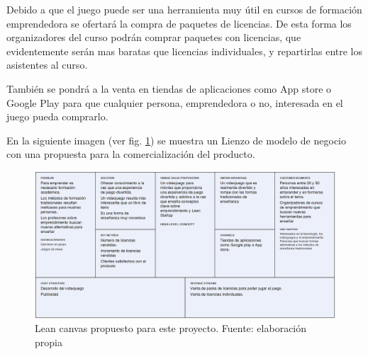 Debido a que el juego puede ser una herramienta muy útil en cursos de formación emprendedora se ofertará la compra de paquetes de licencias. De esta forma los organizadores del curso podrán comprar paquetes con licencias, que evidentemente serán mas baratas que licencias individuales, y repartirlas entre los asistentes al curso. 

También se pondrá a la venta en tiendas de aplicaciones como App store o Google Play para que cualquier persona, emprendedora o no,  interesada en el juego pueda comprarlo.

En la siguiente imagen (ver fig. \ref{leanCanvasDaVinci})  se muestra un Lienzo de modelo de negocio con una propuesta para la comercialización del producto.

\begin{figure}
\begin{center}
\includegraphics[scale=0.3]{imagenes/leanCanvasDaVinciStartup.png}
\caption{Lean canvas propuesto para este proyecto.  Fuente: elaboración propia}
\label{leanCanvasDaVinci}
\end{center}
\end{figure}



